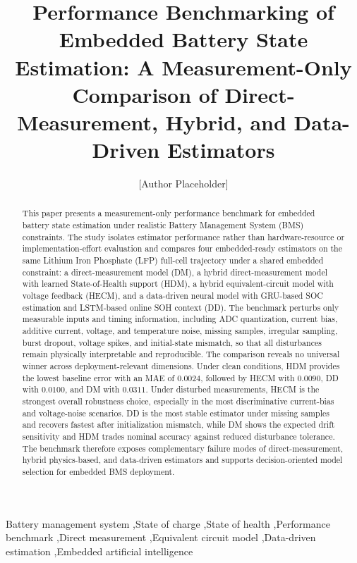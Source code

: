 \documentclass[review,nopreprintline]{elsarticle}
\date{}
\begin{document}
\linenumbers
\begin{frontmatter}
\title{Performance Benchmarking of Embedded Battery State Estimation: A Measurement-Only Comparison of Direct-Measurement, Hybrid, and Data-Driven Estimators}
\author[1]{[Author Placeholder]}
\begin{abstract}
This paper presents a measurement-only performance benchmark for embedded battery state estimation under realistic Battery Management System (BMS) constraints. The study isolates estimator performance rather than hardware-resource or implementation-effort evaluation and compares four embedded-ready estimators on the same Lithium Iron Phosphate (LFP) full-cell trajectory under a shared embedded constraint: a direct-measurement model (DM), a hybrid direct-measurement model with learned State-of-Health support (HDM), a hybrid equivalent-circuit model with voltage feedback (HECM), and a data-driven neural model with GRU-based SOC estimation and LSTM-based online SOH context (DD). The benchmark perturbs only measurable inputs and timing information, including ADC quantization, current bias, additive current, voltage, and temperature noise, missing samples, irregular sampling, burst dropout, voltage spikes, and initial-state mismatch, so that all disturbances remain physically interpretable and reproducible. The comparison reveals no universal winner across deployment-relevant dimensions. Under clean conditions, HDM provides the lowest baseline error with an MAE of $0.0024$, followed by HECM with $0.0090$, DD with $0.0100$, and DM with $0.0311$. Under disturbed measurements, HECM is the strongest overall robustness choice, especially in the most discriminative current-bias and voltage-noise scenarios. DD is the most stable estimator under missing samples and recovers fastest after initialization mismatch, while DM shows the expected drift sensitivity and HDM trades nominal accuracy against reduced disturbance tolerance. The benchmark therefore exposes complementary failure modes of direct-measurement, hybrid physics-based, and data-driven estimators and supports decision-oriented model selection for embedded BMS deployment.
\end{abstract}
\begin{keyword}
Battery management system \sep State of charge \sep State of health \sep Performance benchmark \sep Direct measurement \sep Equivalent circuit model \sep Data-driven estimation \sep Embedded artificial intelligence
\end{keyword}
\end{frontmatter}
\end{document}

